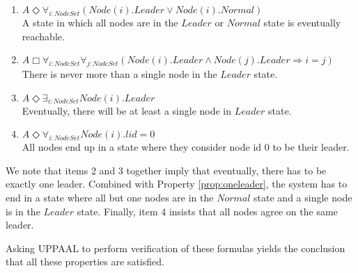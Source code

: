 \begin{enumerate}
\item $A \Diamond \forall_{i:NodeSet} (Node(i).Leader \lor Node(i).Normal)$ \\
A state in which all nodes are in the $Leader$ or $Normal$ state is eventually reachable.
\item $A \Box \forall_{i:NodeSet} \forall_{j:NodeSet} (Node(i).Leader \land Node(j).Leader \Rightarrow i = j)$ \\
There is never more than a single node in the $Leader$ state.
\item $A \Diamond \exists_{i:NodeSet} Node(i).Leader$ \\
Eventually, there will be at least a single node in $Leader$ state.
\item $A \Diamond \forall_{i:NodeSet} Node(i).lid = 0$ \\
All nodes end up in a state where they consider node id $0$ to be their leader.
\end{enumerate}

We note that items 2 and 3 together imply that eventually, there has to be exactly one leader. Combined with Property \ref{prop:oneleader}, the system has to end in a state where all but one nodes are in the $Normal$ state and a single node is in the $Leader$ state. Finally, item 4 insists that all nodes agree on the same leader.

Asking UPPAAL to perform verification of these formulas yields the conclusion that all these properties are satisfied.
